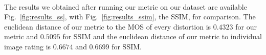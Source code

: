 \documentclass{article}
\begin{document}
\paragraph*{}
The results we obtained after running our metric on our dataset are available Fig.~\ref{fig:results_ss}, with Fig.~\ref{fig:results_ssim}, the SSIM, for comparison. The euclidean distance of our metric to the MOS of every distortion is $0.4323$ for our metric and $0.5095$ for SSIM and the euclidean distance of our metric to individual image rating is $0.6674$ and $0.6699$ for SSIM.

\end{document}

